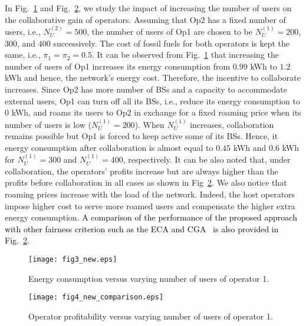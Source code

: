 \documentclass[10pt, letter, twocolumn]{IEEEtran}
\begin{document}
In Fig.~\ref{fig3_new} and Fig.~\ref{fig4_new}, we study the impact of increasing the number of users on the collaborative gain of operators. Assuming that Op2 has a fixed number of users, i.e., $N_{U}^{(2)} = 500$, the number of users of Op1 are chosen to be $N_{U}^{(1)} = 200$, $300$, and $400$ successively. The cost of fossil fuels for both operators is kept the same, i.e., $\pi_{1}=\pi_{2}= 0.5$. It can be observed from Fig.~\ref{fig3_new} that increasing the number of users of Op1 increases its energy consumption from $0.99$ kWh to $1.2$ kWh and hence, the network's energy cost. Therefore, the incentive to collaborate increases. Since Op2 has more number of BSs and a capacity to accommodate external users, Op1 can turn off all its BSs, i.e., reduce its energy consumption to $0$ kWh, and roams its users to Op2 in exchange for a fixed roaming price when its number of users is low ($N_{U}^{(1)} = 200$). When $N_{U}^{(1)}$ increases, collaboration remains possible but Op1 is forced to keep active some of its BSs. Hence, it energy consumption after collaboration is almost equal to $0.45$ kWh and $0.6$ kWh for $N_{U}^{(1)} = 300$ and $N_{U}^{(1)} = 400$, respectively. It can be also noted that, under collaboration, the operators' profits increase but are always higher than the profits before collaboration in all cases as shown in Fig~\ref{fig4_new}. We also notice that roaming prices increase with the load of the network. Indeed, the host operators impose higher cost to serve more roamed users and compensate the higher extra energy consumption. \textcolor{black}{A comparison of the performance of the proposed approach with other fairness criterion such as the ECA and CGA~\cite{6347622} is also provided in Fig.~\ref{fig4_new}.}
\begin{figure}[t!]
  \centering
  \texttt{[image: fig3\_new.eps]}
  \caption{Energy consumption versus varying number of users of operator 1.}\label{fig3_new}\vspace{-0.1cm}
\end{figure}
\begin{figure}[t!]
  \centering
  \texttt{[image: fig4\_new\_comparison.eps]}
  \caption{Operator profitability versus varying number of users of operator 1.}\label{fig4_new}
\end{figure}
\end{document}
